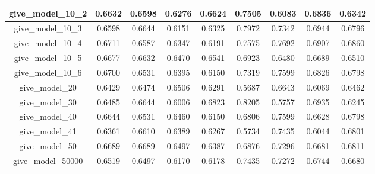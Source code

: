 \begin{table}[!h]
\begin{tabular} {|c|c|c|c|c|c|c|c|c| }
        give\_model\_10\_2                & 0.6632                        & 0.6598                         & 0.6276                      & 0.6624                  & 0.7505 & 0.6083 & 0.6836 & 0.6342 \\ \hline
        give\_model\_10\_3                & 0.6598                        & 0.6644                         & 0.6151                      & 0.6325                  & 0.7972 & 0.7342 & 0.6944 & 0.6796 \\ \hline
        give\_model\_10\_4                & 0.6711                        & 0.6587                         & 0.6347                      & 0.6191                  & 0.7575 & 0.7692 & 0.6907 & 0.6860 \\ \hline
        give\_model\_10\_5                & 0.6677                        & 0.6632                         & 0.6470                      & 0.6541                  & 0.6923 & 0.6480 & 0.6689 & 0.6510 \\ \hline
        give\_model\_10\_6                & 0.6700                        & 0.6531                         & 0.6395                      & 0.6150                  & 0.7319 & 0.7599 & 0.6826 & 0.6798 \\ \hline
        give\_model\_20                   & 0.6429                        & 0.6474                         & 0.6506                      & 0.6291                  & 0.5687 & 0.6643 & 0.6069 & 0.6462 \\ \hline
        give\_model\_30                   & 0.6485                        & 0.6644                         & 0.6006                      & 0.6823                  & 0.8205 & 0.5757 & 0.6935 & 0.6245 \\ \hline
        give\_model\_40                   & 0.6644                        & 0.6531                         & 0.6460                      & 0.6150                  & 0.6806 & 0.7599 & 0.6628 & 0.6798 \\ \hline
        give\_model\_41                   & 0.6361                        & 0.6610                         & 0.6389                      & 0.6267                  & 0.5734 & 0.7435 & 0.6044 & 0.6801 \\ \hline
        give\_model\_50                   & 0.6689                        & 0.6689                         & 0.6497                      & 0.6387                  & 0.6876 & 0.7296 & 0.6681 & 0.6811 \\ \hline
        give\_model\_50000                & 0.6519                        & 0.6497                         & 0.6170                      & 0.6178                  & 0.7435 & 0.7272 & 0.6744 & 0.6680 \\ \hline

\end{tabular}
\end{table}
